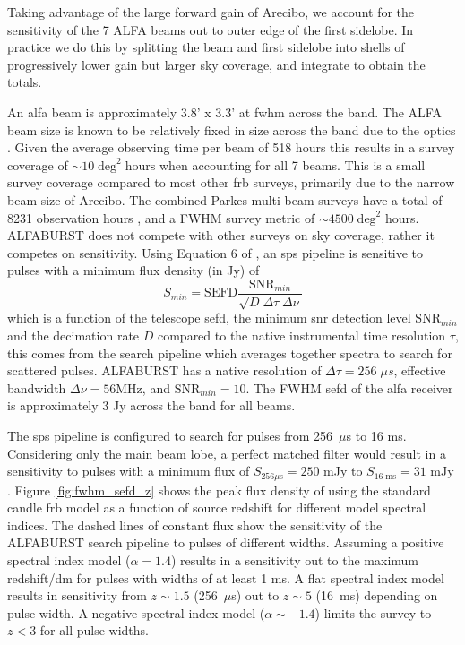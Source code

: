\documentclass[a4paper,fleqn,usenatbib]{mnras}
\begin{document}
Taking advantage of the large forward gain of Arecibo, we account for
the sensitivity of the 7 ALFA beams out to outer edge of the first
sidelobe. In practice we do this by splitting the beam and first
sidelobe into shells of progressively lower gain but larger sky
coverage, and integrate to obtain the totals.

An \gls{alfa} beam is approximately 3.8' x 3.3' at \gls{fwhm} across
the band.  The ALFA beam size is known to be relatively fixed in size
across the band due to the optics \citep{GALFAbeam}.  Given the
average observing time per beam of 518 hours this results in a survey
coverage of $\sim 10 \; \textrm{deg}^2 \; \textrm{hours}$ when
accounting for all 7 beams. This is a small survey coverage compared
to most other \gls{frb} surveys, primarily due to the narrow beam size
of Arecibo. The combined Parkes multi-beam surveys have a total of
8231 observation hours \citep{2016MNRAS.460.3370C}, and a FWHM survey
metric of $\sim 4500 \; \textrm{deg}^2$ hours.  ALFABURST does not
compete with other surveys on sky coverage, rather it competes on
sensitivity.  Using Equation 6 of \cite{2015MNRAS.452.1254K}, an
\gls{sps} pipeline is sensitive to pulses with a minimum flux density
(in Jy) of
%
\begin{equation}
S_{min} = \textrm{SEFD} \frac{\textrm{SNR}_{min}}{\sqrt{D \; \Delta \tau \;
\Delta \nu}}
\end{equation}
%
which is a function of the telescope \gls{sefd}, the minimum \gls{snr}
detection level $\textrm{SNR}_{min}$ and the decimation rate $D$
compared to the native instrumental time resolution $\tau$, this comes
from the search pipeline which averages together spectra to search for
scattered pulses. ALFABURST has a native resolution of $\Delta \tau =
256 \; \mu s$, effective bandwidth $\Delta \nu = 56 \textrm{MHz}$, and
$\textrm{SNR}_{min} = 10$. The FWHM \gls{sefd} of the \gls{alfa}
receiver is approximately 3 Jy across the band for all beams.

The \gls{sps} pipeline is configured to search for pulses from 256~$\mu$s to 16
ms. Considering only the main beam lobe, a perfect matched filter would result
in a sensitivity to pulses with a minimum flux of $S_{256 \mu\textrm{s}} = 250$
mJy to $S_{16 \; \textrm{ms}} = 31$ mJy \citep{2015MNRAS.452.1254K}. Figure
\ref{fig:fwhm_sefd_z} shows the peak flux density of using the standard candle
\gls{frb} model as a function of source redshift for different model spectral
indices. The dashed lines of constant flux show the sensitivity of the ALFABURST
search pipeline to pulses of different widths. Assuming a positive spectral
index model ($\alpha=1.4$) results in a sensitivity out to the maximum
redshift/\gls{dm} for pulses with widths of at least 1 ms. A flat spectral index
model results in sensitivity from $z \sim 1.5$ (256~$\mu$s) out to $z \sim 5$
(16~ms) depending on pulse width. A negative spectral index model ($\alpha \sim
-1.4$) limits the survey to $z < 3$ for all pulse widths.
\end{document}
